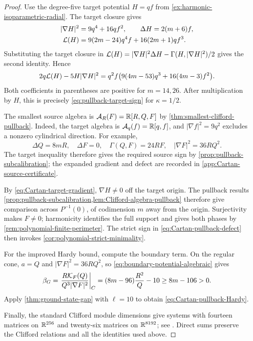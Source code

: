 \begin{proof}
Use the degree-five target potential \(H=qf\) from
\cref{ex:harmonic-isoparametric-radial}. The target closure gives
\begin{align}
 |\nabla H|^2&=9q^4+16qf^2,\qquad
 \Delta H=2(m+6)f,\label{eq:Cartan-target-gradient}\\
 \mathcal L(H)&=9(2m-24)q^4f+16(2m+1)qf^3.
 \label{eq:Cartan-target-defect}
\end{align}
Substituting the target closure in
\(\mathcal L(H)=|\nabla H|^2\Delta H-\Gamma(H,|\nabla H|^2)/2\) gives
the second identity. Hence
\begin{equation}\label{eq:Cartan-target-weighted-defect}
 2q\mathcal L(H)-5H|\nabla H|^2
 =q^2f\bigl(9(4m-53)q^3+16(4m-3)f^2\bigr).
\end{equation}
Both coefficients in parentheses are positive for \(m=14,26\).
After multiplication by \(H\), this is precisely
\eqref{eq:pullback-target-sign} for \(\kappa=1/2\).

The smallest source algebra is \(\mathcal A_R(F)=\mathbb R[R,Q,F]\) by
\cref{thm:smallest-clifford-pullback}. Indeed, the target algebra is
\(\mathcal A_q(f)=\mathbb R[q,f]\), and \(|\nabla f|^2=9q^2\) excludes a
nonzero cylindrical direction. For example,
\[
 \Delta Q=8mR,\quad \Delta F=0,\quad
 \Gamma(Q,F)=24RF,\quad |\nabla F|^2=36RQ^2.
\]
The target inequality therefore gives the required source sign by
\cref{prop:pullback-subcalibration}; the expanded gradient and defect
are recorded in \cref{app:Cartan-source-certificate}.

By \eqref{eq:Cartan-target-gradient}, \(\nabla H\ne0\) off the
target origin. The pullback results
\cref{prop:pullback-subcalibration,lem:Clifford-algebra-pullback}
therefore give comparison across \(P^{-1}(0)\), of codimension \(m\)
away from the origin. Surjectivity makes \(F\ne0\); harmonicity
identifies the full support and gives both phases by
\cref{rem:polynomial-finite-perimeter}. The strict sign in
\eqref{eq:Cartan-pullback-defect} then invokes
\cref{cor:polynomial-strict-minimality}.

For the improved Hardy bound, compute the boundary term. On the regular cone, \(a=Q\) and \(|\nabla F|^2=36RQ^2\), so
\eqref{eq:boundary-potential-algebraic} gives
\[
 \beta_G=\left.\frac{R\mathcal K_F(Q)}{Q^3|\nabla F|^2}\right|_C
 =(8m-96)\frac{R^2}{Q}-10\geq8m-106>0.
\]
Apply \cref{thm:ground-state-gap} with \(\ell=10\) to obtain
\eqref{eq:Cartan-pullback-Hardy}.

Finally, the standard Clifford module dimensions give systems with
fourteen matrices on \(\mathbb R^{256}\) and twenty-six matrices on
\(\mathbb R^{8192}\); see \cite[Table~4.1]{RiedlerThesis25}.  Direct sums preserve
the Clifford relations and all the identities used above.
\end{proof}
